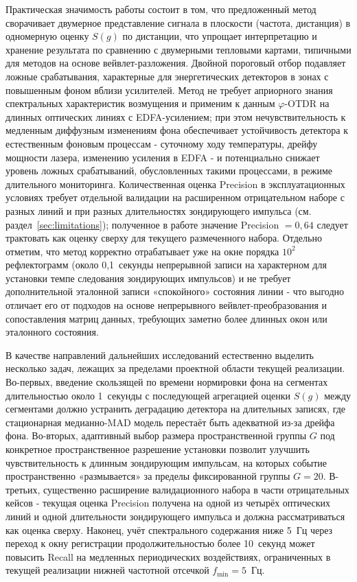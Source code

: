 \documentclass[12pt,a4paper]{extarticle}
\newcommand{\phiOTDR}{$\varphi$-OTDR}
\begin{document}
Практическая значимость работы состоит в том, что предложенный метод сворачивает двумерное представление сигнала в плоскости (частота, дистанция) в одномерную оценку $S(g)$ по дистанции, что упрощает интерпретацию и хранение результата по сравнению с двумерными тепловыми картами, типичными для методов на основе вейвлет-разложения. Двойной пороговый отбор подавляет ложные срабатывания, характерные для энергетических детекторов в зонах с повышенным фоном вблизи усилителей. Метод не требует априорного знания спектральных характеристик возмущения и применим к данным \phiOTDR{} на длинных оптических линиях с EDFA-усилением; при этом нечувствительность к медленным диффузным изменениям фона обеспечивает устойчивость детектора к естественным фоновым процессам - суточному ходу температуры, дрейфу мощности лазера, изменению усиления в EDFA - и потенциально снижает уровень ложных срабатываний, обусловленных такими процессами, в режиме длительного мониторинга. Количественная оценка Precision в эксплуатационных условиях требует отдельной валидации на расширенном отрицательном наборе с разных линий и при разных длительностях зондирующего импульса (см. раздел~\ref{sec:limitations}); полученное в работе значение Precision $= 0{,}64$ следует трактовать как оценку сверху для текущего размеченного набора. Отдельно отметим, что метод корректно отрабатывает уже на окне порядка $10^2$ рефлектограмм (около 0{,}1~секунды непрерывной записи на характерном для установки темпе следования зондирующих импульсов) и не требует дополнительной эталонной записи «спокойного» состояния линии - что выгодно отличает его от подходов на основе непрерывного вейвлет-преобразования и сопоставления матриц данных, требующих заметно более длинных окон или эталонного состояния.

В качестве направлений дальнейших исследований естественно выделить несколько задач, лежащих за пределами проектной области текущей реализации. Во-первых, введение скользящей по времени нормировки фона на сегментах длительностью около 1~секунды с последующей агрегацией оценки $S(g)$ между сегментами должно устранить деградацию детектора на длительных записях, где стационарная медианно-MAD модель перестаёт быть адекватной из-за дрейфа фона. Во-вторых, адаптивный выбор размера пространственной группы $G$ под конкретное пространственное разрешение установки позволит улучшить чувствительность к длинным зондирующим импульсам, на которых событие пространственно «размывается» за пределы фиксированной группы $G = 20$. В-третьих, существенно расширение валидационного набора в части отрицательных кейсов - текущая оценка Precision получена на одной из четырёх оптических линий и одной длительности зондирующего импульса и должна рассматриваться как оценка сверху. Наконец, учёт спектрального содержания ниже 5~Гц через переход к окну регистрации продолжительностью более 10~секунд может повысить Recall на медленных периодических воздействиях, ограниченных в текущей реализации нижней частотной отсечкой $f_\text{min} = 5$~Гц.
\end{document}
